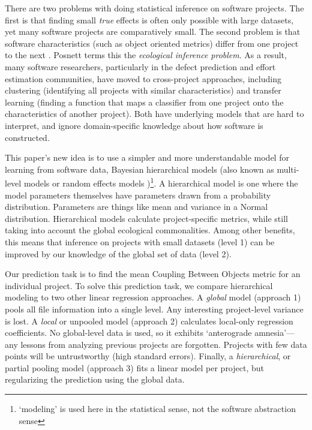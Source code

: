 \documentclass[sigconf,natbib=false]{acmart}
\begin{document}
There are two problems with doing statistical inference on software projects.
The first is that finding small \emph{true} effects is often only possible with
large datasets, yet many software projects are comparatively small. The second
problem is that software characteristics (such as object oriented metrics)
differ from one project to the next \cite{zhang13context}. Posnett
\cite{Posnett:2011} terms this the \emph{ecological inference problem}. As a
result, many software researchers, particularly in the defect prediction and
effort estimation communities, have moved to cross-project approaches, including
clustering (identifying all projects with similar characteristics) and transfer
learning (finding a function that maps a classifier from one project onto the
characteristics of another project). Both have underlying models that are hard
to interpret, and ignore domain-specific knowledge about how software is
constructed. 

This paper's new idea is to use a simpler and more understandable model for
learning from software data, Bayesian hierarchical models (also known as
multi-level models or random effects models \cite{Sorensen16})\footnote{`modeling' is used here in
the statistical sense, not the software abstraction sense}. A hierarchical model
is one where the model parameters themselves have parameters drawn from a
probability distribution. Parameters are things like mean and variance in a
Normal distribution. Hierarchical models calculate project-specific metrics,
while still taking into account the global ecological commonalities. Among other
benefits, this means that inference on projects with small datasets (level 1)
can be improved by our knowledge of the global set of data (level 2). 

Our prediction task is to find the mean Coupling Between Objects metric for an
individual project. To solve this prediction task, we compare hierarchical
modeling to two other linear regression approaches. A \emph{global} model
(approach 1) pools all file information into a single level. Any interesting
project-level variance is lost. A \emph{local} or unpooled model (approach 2)
calculates local-only regression coefficients. No global-level data is used, so
it exhibits `anterograde amnesia'---any lessons from analyzing previous projects
are forgotten. Projects with few data points will be untrustworthy (high
standard errors). Finally, a \emph{hierarchical}, or partial pooling model
(approach 3) fits a linear model per project, but regularizing the prediction
using the global data. 
\end{document}
